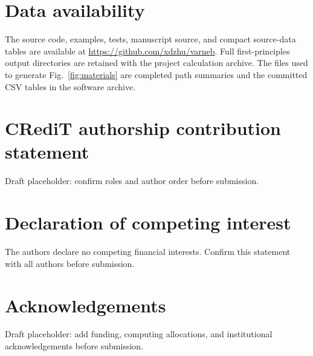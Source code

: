 \documentclass[final,3p,times]{elsarticle}
\begin{document}
\section*{Data availability}

The source code, examples, tests, manuscript source, and compact source-data
tables are available at \url{https://github.com/xdzhu/varneb}. Full
first-principles output directories are retained with the project calculation
archive. The files used to generate Fig.~\ref{fig:materials} are completed
path summaries and the committed CSV tables in the software archive.

\section*{CRediT authorship contribution statement}
Draft placeholder: confirm roles and author order before submission.

\section*{Declaration of competing interest}
The authors declare no competing financial interests. Confirm this statement
with all authors before submission.

\section*{Acknowledgements}
Draft placeholder: add funding, computing allocations, and institutional
acknowledgements before submission.


\end{document}
